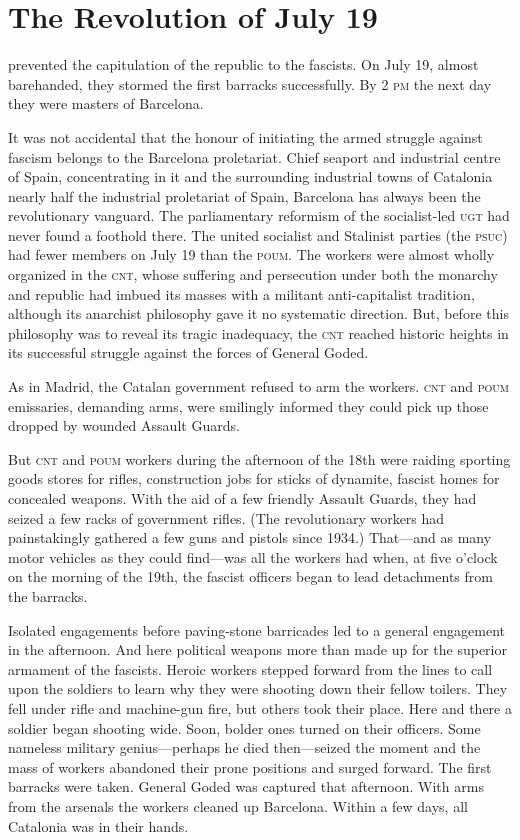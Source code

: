 \chapter{The Revolution of July 19}

 prevented the capitulation of the republic to the fascists. On July 19, almost barehanded, they stormed the first barracks successfully. By 2 \textsc{pm} the next day they were masters of Barcelona.

It was not accidental that the honour of initiating the armed struggle against fascism belongs to the Barcelona proletariat. Chief seaport and industrial centre of Spain, concentrating in it and the surrounding industrial towns of Catalonia nearly half the industrial proletariat of Spain, Barcelona has always been the revolutionary vanguard. The parliamentary reformism of the socialist-led \textsc{ugt} had never found a foothold there. The united socialist and Stalinist parties (the \textsc{psuc}) had fewer members on July 19 than the \textsc{poum}. The workers were almost wholly organized in the \textsc{cnt}, whose suffering and persecution under both the monarchy and republic had imbued its masses with a militant anti-capitalist tradition, although its anarchist philosophy gave it no systematic direction. But, before this philosophy was to reveal its tragic inadequacy, the \textsc{cnt} reached historic heights in its successful struggle against the forces of General Goded.

As in Madrid, the Catalan government refused to arm the workers. \textsc{cnt} and \textsc{poum} emissaries, demanding arms, were smilingly informed they could pick up those dropped by wounded Assault Guards.

But \textsc{cnt} and \textsc{poum} workers during the afternoon of the 18th were raiding sporting goods stores for rifles, construction jobs for sticks of dynamite, fascist homes for concealed weapons. With the aid of a few friendly Assault Guards, they had seized a few racks of government rifles. (The revolutionary workers had painstakingly gathered a few guns and pistols since 1934.) That---and as many motor vehicles as they could find---was all the workers had when, at five o’clock on the morning of the 19th, the fascist officers began to lead detachments from the barracks.

Isolated engagements before paving-stone barricades led to a general engagement in the afternoon. And here political weapons more than made up for the superior armament of the fascists. Heroic workers stepped forward from the lines to call upon the soldiers to learn why they were shooting down their fellow toilers. They fell under rifle and machine-gun fire, but others took their place. Here and there a soldier began shooting wide. Soon, bolder ones turned on their officers. Some nameless military genius---perhaps he died then---seized the moment and the mass of workers abandoned their prone positions and surged forward. The first barracks were taken. General Goded was captured that afternoon. With arms from the arsenals the workers cleaned up Barcelona. Within a few days, all Catalonia was in their hands.

